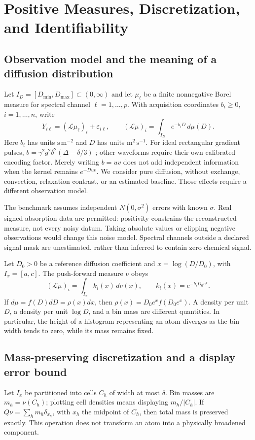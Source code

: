 \section{Positive Measures, Discretization, and Identifiability}\label{sec:theory}
\subsection{Observation model and the meaning of a diffusion distribution}
Let $I_D=[D_{\min},D_{\max}]\subset(0,\infty)$ and let $\mu_\ell$ be a finite nonnegative Borel measure for spectral channel $\ell=1,\ldots,p$. With acquisition coordinates $b_i\geq0$, $i=1,\ldots,n$, write
\begin{equation}\label{eq:measure}
 Y_{i\ell}=(\mathcal L\mu_\ell)_i+\varepsilon_{i\ell},\qquad
 (\mathcal L\mu)_i=\int_{I_D}e^{-b_iD}\,d\mu(D).
\end{equation}
Here $b_i$ has units $\mathrm{s\,m^{-2}}$ and $D$ has units $\mathrm{m^2\,s^{-1}}$. For ideal rectangular gradient pulses, $b=\gamma^2g^2\delta^2(\Delta-\delta/3)$ \cite{stejskal}; other waveforms require their own calibrated encoding factor. Merely writing $b=uv$ does not add independent information when the kernel remains $e^{-Duv}$. We consider pure diffusion, without exchange, convection, relaxation contrast, or an estimated baseline. Those effects require a different observation model.

The benchmark assumes independent $N(0,\sigma^2)$ errors with known $\sigma$. Real signed absorption data are permitted: positivity constrains the reconstructed measure, not every noisy datum. Taking absolute values or clipping negative observations would change this noise model. Spectral channels outside a declared signal mask are unestimated, rather than inferred to contain zero chemical signal.

Let $D_0>0$ be a reference diffusion coefficient and $x=\log(D/D_0)$, with $I_x=[a,c]$. The push-forward measure $\nu$ obeys
\begin{equation}\label{eq:log}
 (\mathcal L\mu)_i=\int_{I_x} k_i(x)\,d\nu(x),\qquad
 k_i(x)=e^{-b_iD_0e^x}.
\end{equation}
If $d\mu=f(D)dD=\rho(x)dx$, then $\rho(x)=D_0e^x f(D_0e^x)$. A density per unit $D$, a density per unit $\log D$, and a bin mass are different quantities. In particular, the height of a histogram representing an atom diverges as the bin width tends to zero, while its mass remains fixed.

\subsection{Mass-preserving discretization and a display error bound}
Let $I_x$ be partitioned into cells $C_h$ of width at most $\delta$. Bin masses are $m_h=\nu(C_h)$; plotting cell densities means displaying $m_h/|C_h|$. If $Q\nu=\sum_h m_h\delta_{x_h}$, with $x_h$ the midpoint of $C_h$, then total mass is preserved exactly. This operation does not transform an atom into a physically broadened component.

